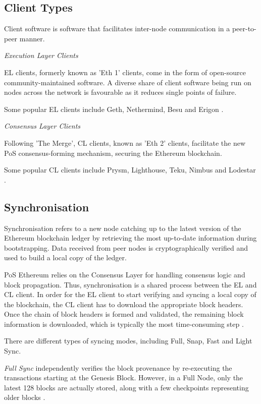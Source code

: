 \subsection{Client Types}

Client software is software that facilitates inter-node communication in a peer-to-peer manner.

\textit{Execution Layer Clients}

EL clients,  formerly known as 'Eth 1' clients, come in the form of open-source community-maintained software. A diverse share of client software being run on nodes across the network is favourable as it reduces single points of failure.

Some popular EL clients include Geth, Nethermind, Besu and Erigon \cite{EthereumEthereum.org}. 

\textit{Consensus Layer Clients }

Following 'The Merge', CL clients, known as 'Eth 2' clients, facilitate the new PoS consensus-forming mechanism, securing the Ethereum blockchain.

Some popular CL clients include Prysm, Lighthouse, Teku, Nimbus and Lodestar \cite{EthereumEthereum.org}. 
\subsection{Synchronisation} 
\label{SyncLitRev}

Synchronisation refers to a new node catching up to the latest version of the Ethereum blockchain ledger by retrieving the most up-to-date information during bootstrapping. Data received from peer nodes is cryptographically verified and used to build a local copy of the ledger.

PoS Ethereum relies on the Consensus Layer for handling consensus logic and block propagation. Thus, synchronisation is a shared process between the EL and CL client. In order for the EL client to start verifying and syncing a local copy of the blockchain, the CL client has to download the appropriate block headers. Once the chain of block headers is formed and validated, the remaining block information is downloaded, which is typically the most time-consuming step \cite{2022DeveloperGo-ethereum}.

There are different types of syncing modes, including Full, Snap, Fast and Light Sync.

\textit{Full Sync }independently verifies the block provenance by re-executing the transactions starting at the Genesis Block. However, in a Full Node, only the latest 128 blocks are actually stored, along with a few checkpoints representing older blocks \cite{EthereumEthereum.org}. 

